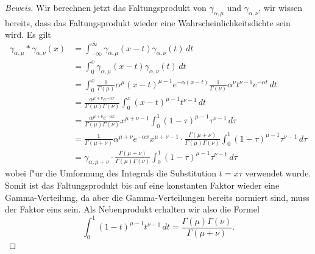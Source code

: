 {\begin{proof}[Beweis]
Wir berechnen jetzt das Faltungsprodukt von $\gamma_{\alpha,\mu}$ und
$\gamma_{\alpha,\nu}$, wir wissen bereits, dass das Faltungsprodukt wieder
eine Wahrscheinlichkeitsdichte sein wird. Es gilt
\begin{align*}
\gamma_{\alpha,\mu}*\gamma_{\alpha,\nu}(x)
&=\int_{-\infty}^\infty \gamma_{\alpha,\mu}(x-t)\gamma_{\alpha,\nu}(t)\,dt\\
&=\int_0^x \gamma_{\alpha,\mu}(x-t)\gamma_{\alpha,\nu}(t)\,dt\\
&=\int_0^x \frac1{\Gamma(\mu)}\alpha^{\mu}(x-t)^{\mu-1}e^{-\alpha (x-t)}
\frac1{\Gamma(\nu)}\alpha^\nu t^{\nu-1}e^{-\alpha t}\,dt\\
&=\frac{\alpha^{\mu+\nu}e^{-\alpha x}}{\Gamma(\mu)\Gamma(\nu)}\int_0^x
(x-t)^{\mu-1}t^{\nu-1}\,dt\\
&=\frac{\alpha^{\mu+\nu}e^{-\alpha x}}{\Gamma(\mu)\Gamma(\nu)}x^{\mu+\nu-1}
\int_0^1 (1-\tau)^{\mu-1}\tau^{\nu-1}\,d\tau\\
&=
\frac1{\Gamma(\mu+\nu)}\alpha^{\mu+\nu}e^{-\alpha x}
x^{\mu+\nu-1}
\cdot
\frac{\Gamma(\mu+\nu)}{\Gamma(\mu)\Gamma(\nu)}
\int_0^1 (1-\tau)^{\mu-1}\tau^{\nu-1}\,d\tau\\
&=\gamma_{\alpha,\mu+\nu}
\cdot
\frac{\Gamma(\mu+\nu)}{\Gamma(\mu)\Gamma(\nu)}
\int_0^1 (1-\tau)^{\mu-1}\tau^{\nu-1}\,d\tau
\end{align*}
wobei f"ur die Umformung des Integrals die Substitution $t=x\tau$ verwendet
wurde. Somit ist das Faltungsprodukt bis auf eine konstanten Faktor
wieder eine Gamma-Verteilung, da aber die Gamma-Verteilungen bereits
normiert sind, muss der Faktor eins sein. Als Nebenprodukt erhalten
wir also die Formel
\[
\int_0^1(1-t)^{\mu-1}t^{\nu-1}\,dt=\frac{\Gamma(\mu)\Gamma(\nu)}{\Gamma(\mu+\nu)}.
\]
\end{proof}

}
